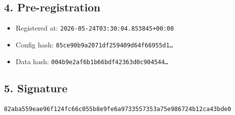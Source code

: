 \documentclass{article}
\begin{document}
\subsection*{4. Pre-registration}
\begin{itemize}
\item Registered at: \texttt{2026-05-24T03:30:04.853845+00:00}
\item Config hash: \texttt{85ce90b9a2071df259409d64f66955d1\dots}
\item Data hash: \texttt{004b9e2af6b1b66bdf42363d0c904544\dots}
\end{itemize}
\subsection*{5. Signature}
\texttt{82aba559eae96f124fc66c055b8e9fe6a9733557353a75e986724b12ca43bde0}\\
\end{document}
